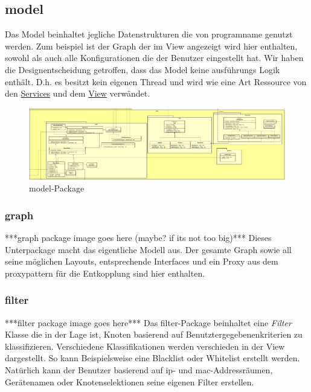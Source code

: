\subsection{model}
\label{subsec:model}

Das Model beinhaltet jegliche Datenstrukturen die von \gls{programname} genutzt
werden. Zum beispiel ist der Graph der im View angezeigt wird hier enthalten, sowohl
als auch alle Konfigurationen die der Benutzer eingestellt hat. Wir haben die
Designentscheidung getroffen, dass das Model keine ausführungs Logik enthält.
D.h. es besitzt kein eigenen Thread und wird wie eine Art Ressource von den
\hyperref[subsec:service]{Services} und dem \hyperref[subsec:view]{View} verwändet.

\begin{figure}[H]
  \centering
  \includegraphics[width=\textwidth]{../diagramimages/model.png}
  \caption{model-Package}
\end{figure}

    \subsubsection{graph}
    \label{subsubsec:graph}
    ***graph package image goes here (maybe? if its not too big)***
    \newline
    \newline
    Dieses Unterpackage macht das eigentliche Modell aus. Der gesamte Graph sowie
    all seine möglichen Layouts, entsprechende Interfaces und ein Proxy aus dem
    \gls{proxypattern} für die Entkopplung sind hier enthalten.

    \subsubsection{filter}
    \label{subsubsec:filter}
    ***filter package image goes here***
    \newline
    \newline
    Das filter-Package beinhaltet eine \textit{Filter} Klasse die in der Lage ist,
    Knoten basierend auf Benutztergegebenenkriterien zu klassifizieren. Verschiedene
    Klassifikationen werden verschieden in der View dargestellt. So kann
    Beispielsweise eine Blacklist oder Whitelist erstellt werden.
    Natürlich kann der Benutzer basierend auf \gls{ip}- und \gls{mac}-Addressräumen,
    Gerätenamen oder Knotenselektionen seine eigenen Filter erstellen.

